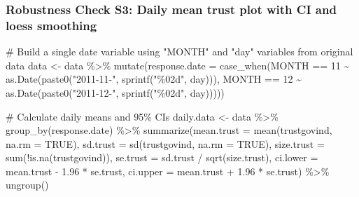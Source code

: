 \documentclass[
  letterpaper,
  DIV=11,
  numbers=noendperiod]{scrartcl}
\newenvironment{Shaded}{\begin{snugshade}}{\end{snugshade}}
\newcommand{\AttributeTok}[1]{\textcolor[rgb]{0.40,0.45,0.13}{#1}}
\newcommand{\CommentTok}[1]{\textcolor[rgb]{0.37,0.37,0.37}{#1}}
\newcommand{\ConstantTok}[1]{\textcolor[rgb]{0.56,0.35,0.01}{#1}}
\newcommand{\DecValTok}[1]{\textcolor[rgb]{0.68,0.00,0.00}{#1}}
\newcommand{\FloatTok}[1]{\textcolor[rgb]{0.68,0.00,0.00}{#1}}
\newcommand{\FunctionTok}[1]{\textcolor[rgb]{0.28,0.35,0.67}{#1}}
\newcommand{\NormalTok}[1]{\textcolor[rgb]{0.00,0.23,0.31}{#1}}
\newcommand{\OtherTok}[1]{\textcolor[rgb]{0.00,0.23,0.31}{#1}}
\newcommand{\SpecialCharTok}[1]{\textcolor[rgb]{0.37,0.37,0.37}{#1}}
\newcommand{\StringTok}[1]{\textcolor[rgb]{0.13,0.47,0.30}{#1}}
\begin{document}
\subsubsection{Robustness Check S3: Daily mean trust plot with CI and
loess
smoothing}\label{robustness-check-s3-daily-mean-trust-plot-with-ci-and-loess-smoothing}

\begin{Shaded}
\begin{Highlighting}[]
\CommentTok{\# Build a single date variable using "MONTH" and "day" variables from original data}
\NormalTok{data }\OtherTok{\textless{}{-}}\NormalTok{ data }\SpecialCharTok{\%\textgreater{}\%} 
  \FunctionTok{mutate}\NormalTok{(}\AttributeTok{response.date =} \FunctionTok{case\_when}\NormalTok{(MONTH }\SpecialCharTok{==} \DecValTok{11} \SpecialCharTok{\textasciitilde{}} \FunctionTok{as.Date}\NormalTok{(}\FunctionTok{paste0}\NormalTok{(}\StringTok{"2011{-}11{-}"}\NormalTok{, }\FunctionTok{sprintf}\NormalTok{(}\StringTok{"\%02d"}\NormalTok{, day))),}
\NormalTok{                                   MONTH }\SpecialCharTok{==} \DecValTok{12} \SpecialCharTok{\textasciitilde{}} \FunctionTok{as.Date}\NormalTok{(}\FunctionTok{paste0}\NormalTok{(}\StringTok{"2011{-}12{-}"}\NormalTok{, }\FunctionTok{sprintf}\NormalTok{(}\StringTok{"\%02d"}\NormalTok{, day)))))}

\CommentTok{\# Calculate daily means and 95\% CIs}
\NormalTok{daily.data }\OtherTok{\textless{}{-}}\NormalTok{ data }\SpecialCharTok{\%\textgreater{}\%} 
  \FunctionTok{group\_by}\NormalTok{(response.date) }\SpecialCharTok{\%\textgreater{}\%} 
  \FunctionTok{summarize}\NormalTok{(}\AttributeTok{mean.trust =} \FunctionTok{mean}\NormalTok{(trustgovind, }\AttributeTok{na.rm =} \ConstantTok{TRUE}\NormalTok{),}
            \AttributeTok{sd.trust =} \FunctionTok{sd}\NormalTok{(trustgovind, }\AttributeTok{na.rm =} \ConstantTok{TRUE}\NormalTok{),}
            \AttributeTok{size.trust =} \FunctionTok{sum}\NormalTok{(}\SpecialCharTok{!}\FunctionTok{is.na}\NormalTok{(trustgovind)),}
            \AttributeTok{se.trust =}\NormalTok{ sd.trust }\SpecialCharTok{/} \FunctionTok{sqrt}\NormalTok{(size.trust),}
            \AttributeTok{ci.lower =}\NormalTok{ mean.trust }\SpecialCharTok{{-}} \FloatTok{1.96} \SpecialCharTok{*}\NormalTok{ se.trust,}
            \AttributeTok{ci.upper =}\NormalTok{ mean.trust }\SpecialCharTok{+} \FloatTok{1.96} \SpecialCharTok{*}\NormalTok{ se.trust) }\SpecialCharTok{\%\textgreater{}\%} 
  \FunctionTok{ungroup}\NormalTok{()}


\end{Highlighting}
\end{Shaded}
\end{document}
